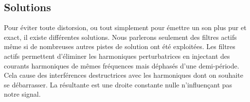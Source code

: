 \subsection{Solutions}
Pour éviter toute distorsion, ou tout simplement pour émettre un son plus pur et exact, 
il existe différentes solutions. Nous parlerons seulement des filtres actifs 
même si de nombreuses autres pistes de solution ont été exploitées.
Les filtres actifs permettent d'éliminer les harmoniques perturbatrices en injectant des courants
harmoniques de mêmes fréquences mais déphasés d'une demi-période. Cela cause des interférences
destructrices avec les harmoniques dont on souhaite se débarrasser. La résultante est une droite constante
nulle n'influençant pas notre signal\cite{brevet1}.



